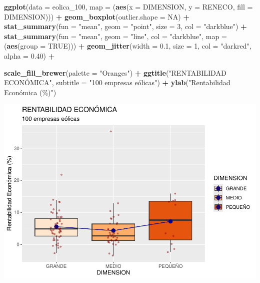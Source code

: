 \documentclass[
]{book}
\newenvironment{Shaded}{\begin{snugshade}}{\end{snugshade}}
\newcommand{\AttributeTok}[1]{\textcolor[rgb]{0.13,0.29,0.53}{#1}}
\newcommand{\ConstantTok}[1]{\textcolor[rgb]{0.56,0.35,0.01}{#1}}
\newcommand{\DecValTok}[1]{\textcolor[rgb]{0.00,0.00,0.81}{#1}}
\newcommand{\FloatTok}[1]{\textcolor[rgb]{0.00,0.00,0.81}{#1}}
\newcommand{\FunctionTok}[1]{\textcolor[rgb]{0.13,0.29,0.53}{\textbf{#1}}}
\newcommand{\NormalTok}[1]{#1}
\newcommand{\SpecialCharTok}[1]{\textcolor[rgb]{0.81,0.36,0.00}{\textbf{#1}}}
\newcommand{\StringTok}[1]{\textcolor[rgb]{0.31,0.60,0.02}{#1}}
\let\Oldincludegraphics\includegraphics
\renewcommand{\includegraphics}[2][]{%
  \Oldincludegraphics[#1]{#2}%
}
\begin{document}
\begin{Shaded}
\begin{Highlighting}[]
\FunctionTok{ggplot}\NormalTok{(}\AttributeTok{data =}\NormalTok{ eolica\_100, }\AttributeTok{map =}\NormalTok{ (}\FunctionTok{aes}\NormalTok{(}\AttributeTok{x =}\NormalTok{ DIMENSION, }\AttributeTok{y =}\NormalTok{ RENECO, }\AttributeTok{fill =}\NormalTok{ DIMENSION))) }\SpecialCharTok{+}
  \FunctionTok{geom\_boxplot}\NormalTok{(}\AttributeTok{outlier.shape =} \ConstantTok{NA}\NormalTok{) }\SpecialCharTok{+}
  \FunctionTok{stat\_summary}\NormalTok{(}\AttributeTok{fun =} \StringTok{"mean"}\NormalTok{,}
               \AttributeTok{geom =} \StringTok{"point"}\NormalTok{,}
               \AttributeTok{size =} \DecValTok{3}\NormalTok{,}
               \AttributeTok{col =} \StringTok{"darkblue"}\NormalTok{) }\SpecialCharTok{+}
  \FunctionTok{stat\_summary}\NormalTok{(}\AttributeTok{fun =} \StringTok{"mean"}\NormalTok{,}
               \AttributeTok{geom =} \StringTok{"line"}\NormalTok{,}
               \AttributeTok{col =} \StringTok{"darkblue"}\NormalTok{,}
               \AttributeTok{map =}\NormalTok{ (}\FunctionTok{aes}\NormalTok{(}\AttributeTok{group =} \ConstantTok{TRUE}\NormalTok{))) }\SpecialCharTok{+}
    \FunctionTok{geom\_jitter}\NormalTok{(}\AttributeTok{width =} \FloatTok{0.1}\NormalTok{,}
              \AttributeTok{size =} \DecValTok{1}\NormalTok{,}
              \AttributeTok{col =} \StringTok{"darkred"}\NormalTok{,}
              \AttributeTok{alpha =} \FloatTok{0.40}\NormalTok{) }\SpecialCharTok{+}

  \FunctionTok{scale\_fill\_brewer}\NormalTok{(}\AttributeTok{palette =} \StringTok{"Oranges"}\NormalTok{) }\SpecialCharTok{+}
  \FunctionTok{ggtitle}\NormalTok{(}\StringTok{"RENTABILIDAD ECONÓMICA"}\NormalTok{, }\AttributeTok{subtitle =} \StringTok{"100 empresas eólicas"}\NormalTok{) }\SpecialCharTok{+}
  \FunctionTok{ylab}\NormalTok{(}\StringTok{"Rentabilidad Económica (\%)"}\NormalTok{)}
\end{Highlighting}
\end{Shaded}

\includegraphics{_main_files/figure-latex/unnamed-chunk-116-1.pdf}
\end{document}

